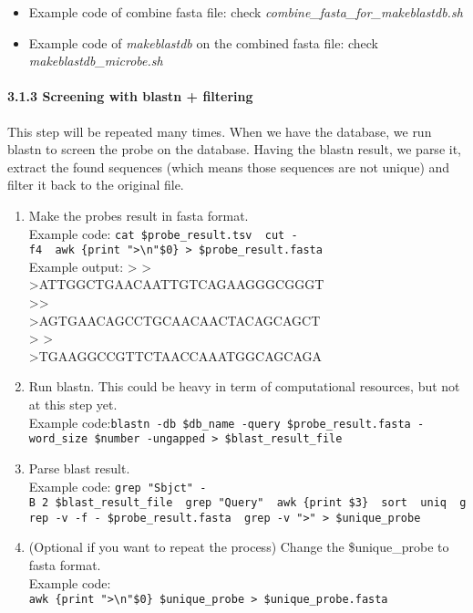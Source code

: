 \documentclass[
]{article}
\providecommand{\tightlist}{%
  \setlength{\itemsep}{0pt}\setlength{\parskip}{0pt}}
\begin{document}
\begin{itemize}
\tightlist
\item
  Example code of combine fasta file: check
  \emph{combine\_fasta\_for\_makeblastdb.sh}
\item
  Example code of \emph{makeblastdb} on the combined fasta file: check
  \emph{makeblastdb\_microbe.sh}
\end{itemize}

\paragraph{3.1.3 Screening with blastn +
filtering}\label{screening-with-blastn-filtering}

This step will be repeated many times. When we have the database, we run
blastn to screen the probe on the database. Having the blastn result, we
parse it, extract the found sequences (which means those sequences are
not unique) and filter it back to the original file.

\begin{enumerate}
\def\labelenumi{\arabic{enumi}.}
\tightlist
\item
  Make the probes result in fasta format.\\
  Example code:
  \texttt{cat\ \$probe\_result.tsv\ \textbar{}\ cut\ -f4\ \textbar{}\ awk\ \textquotesingle{}\{print\ "\textgreater{}\textbackslash{}n"\$0\}\textquotesingle{}\ \textgreater{}\ \$probe\_result.fasta}\\
  Example output: \textgreater{} \textgreater{}\\
  \textgreater ATTGGCTGAACAATTGTCAGAAGGGCGGGT\\
  \textgreater\textgreater{}\\
  \textgreater AGTGAACAGCCTGCAACAACTACAGCAGCT\\
  \textgreater{} \textgreater{}\\
  \textgreater TGAAGGCCGTTCTAACCAAATGGCAGCAGA
\item
  Run blastn. This could be heavy in term of computational resources,
  but not at this step yet.\\
  Example
  code:\texttt{blastn\ -db\ \$db\_name\ -query\ \$probe\_result.fasta\ -word\_size\ \$number\ -ungapped\ \textgreater{}\ \$blast\_result\_file}
\item
  Parse blast result.\\
  Example code:
  \texttt{grep\ "Sbjct"\ -B\ 2\ \$blast\_result\_file\ \textbar{}\ grep\ "Query"\ \textbar{}\ awk\ \textquotesingle{}\{print\ \$3\}\textquotesingle{}\ \textbar{}\ sort\ \textbar{}\ uniq\ \textbar{}\ grep\ -v\ -f\ -\ \$probe\_result.fasta\ \textbar{}\ grep\ -v\ "\textgreater{}"\ \textgreater{}\ \$unique\_probe}
\item
  (Optional if you want to repeat the process) Change the
  \$unique\_probe to fasta format.\\
  Example code:
  \texttt{awk\ \textquotesingle{}\{print\ "\textgreater{}\textbackslash{}n"\$0\}\textquotesingle{}\ \$unique\_probe\ \textgreater{}\ \$unique\_probe.fasta}
\end{enumerate}
\end{document}
